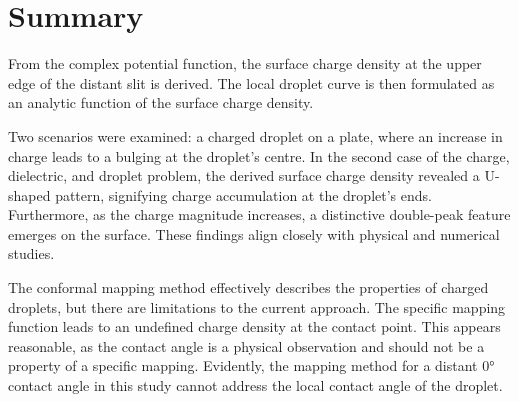 \section{Summary}
\hspace{0em}\indent From the complex potential function, the surface charge density at the upper edge of the distant slit is derived. The local droplet curve is then formulated as an analytic function of the surface charge density.

Two scenarios were examined: a charged droplet on a plate, where an increase in charge leads to a bulging at the droplet's centre. In the second case of the charge, dielectric, and droplet problem, the derived surface charge density revealed a U-shaped pattern, signifying charge accumulation at the droplet's ends. Furthermore, as the charge magnitude increases, a distinctive double-peak feature emerges on the surface. These findings align closely with physical and numerical studies.

The conformal mapping method effectively describes the properties of charged droplets, but there are limitations to the current approach. The specific mapping function leads to an undefined charge density at the contact point. This appears reasonable, as the contact angle is a physical observation and should not be a property of a specific mapping. Evidently, the mapping method for a distant 0° contact angle in this study cannot address the local contact angle of the droplet.

